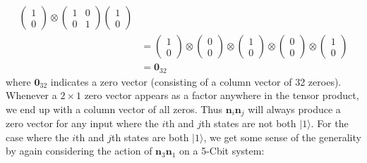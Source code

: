 \documentclass{article}
\begin{document}
\begin{align*}
     \begin{pmatrix}1\\0\end{pmatrix}
     \otimes
     \begin{pmatrix}1 & 0\\0 & 1\end{pmatrix}
     \begin{pmatrix}1\\0\end{pmatrix}\\
  &= \begin{pmatrix}1\\0\end{pmatrix}
     \otimes
     \begin{pmatrix}0\\0\end{pmatrix}
     \otimes
     \begin{pmatrix}1\\0\end{pmatrix}
     \otimes
     \begin{pmatrix}0\\0\end{pmatrix}
     \otimes
     \begin{pmatrix}1\\0\end{pmatrix}\\
  &= \bm{0}_{32}
\end{align*}
where $\bm{0}_{32}$ indicates a zero vector (consisting of a column vector of 32 zeroes). Whenever a $2 \times 1$ zero vector appears as a factor anywhere in the tensor product, we end up with a column vector of all zeros. Thus $\bm{n}_i \bm{n}_j$ will always produce a zero vector for any input where the $i$th and $j$th states are not both $|1\rangle$. For the case where the $i$th and $j$th states are both $|1\rangle$, we get some sense of the generality by again considering the action of $\bm{n}_3\bm{n}_1$ on a 5-Cbit system:
\end{document}
